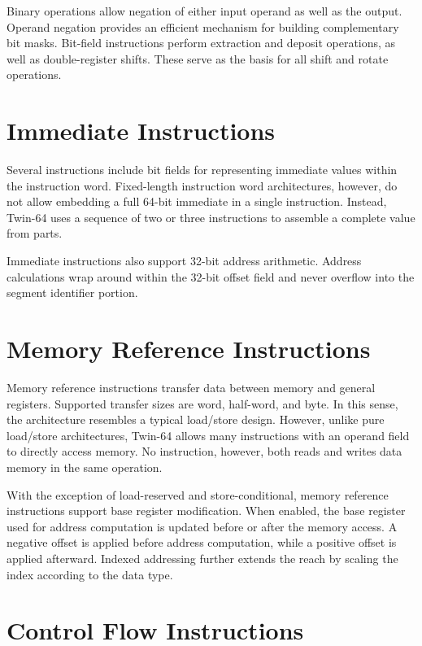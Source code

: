 Binary operations allow negation of either input operand as well as the output. Operand negation provides an efficient mechanism for building complementary bit masks. Bit-field instructions perform extraction and deposit operations, as well as double-register shifts. These serve as the basis for all shift and rotate operations.

\section*{Immediate Instructions}

Several instructions include bit fields for representing immediate values within the instruction word. Fixed-length instruction word architectures, however, do not allow embedding a full 64-bit immediate in a single instruction. Instead, Twin-64 uses a sequence of two or three instructions to assemble a complete value from parts.

Immediate instructions also support 32-bit address arithmetic. Address calculations wrap around within the 32-bit offset field and never overflow into the segment identifier portion.

\section*{Memory Reference Instructions}

Memory reference instructions transfer data between memory and general registers. Supported transfer sizes are word, half-word, and byte. In this sense, the architecture resembles a typical load/store design. However, unlike pure load/store architectures, Twin-64 allows many instructions with an operand field to directly access memory. No instruction, however, both reads and writes data memory in the same operation.

With the exception of load-reserved and store-conditional, memory reference instructions support base register modification. When enabled, the base register used for address computation is updated before or after the memory access. A negative offset is applied before address computation, while a positive offset is applied afterward. Indexed addressing further extends the reach by scaling the index according to the data type.

\section*{Control Flow Instructions}

